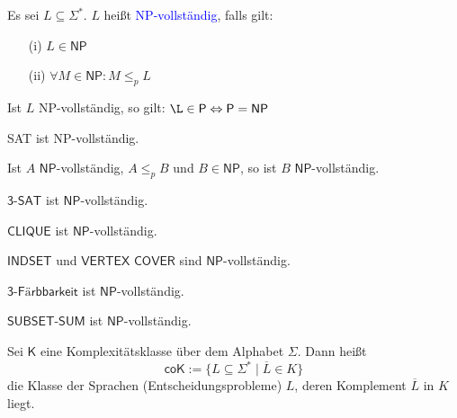 \documentclass{scrreprt}
\begin{document}
\begin{Definition}
Es sei $L\subseteq\Sigma^*$. $L$ heißt \textcolor{blue}{\textsf{NP}-vollständig}, falls gilt:
\begin{enumerate}
\item[(i)] $L\in \textsf{NP}$
\item[(ii)] $\forall M\in\textsf{NP}: M\leq_p L$
\end{enumerate}
\end{Definition}
\begin{Lemma}
Ist $L$ \textsf{NP}-vollständig, so gilt: $\L \in \textsf{P} \Leftrightarrow \textsf{P} = \textsf{NP}$
\end{Lemma}
\begin{Satz}
\textsf{SAT} ist \textsf{NP}-vollständig.
\end{Satz}
\begin{Satz}
Ist $A$ $\textsf{NP}$-vollständig, $A \leq_p B$ und $B \in \textsf{NP}$, so ist $B$ $\textsf{NP}$-vollständig.
\end{Satz}

\begin{Satz}
$\textsf{3-SAT}$ ist $\textsf{NP}$-vollständig.
\end{Satz}

\begin{Satz}
$\textsf{CLIQUE}$ ist $\textsf{NP}$-vollständig.
\end{Satz}

\begin{Satz}
$\textsf{INDSET}$ und $\textsf{VERTEX COVER}$ sind $\textsf{NP}$-vollständig.
\end{Satz}

\begin{Satz}
$\textsf{3-Färbbarkeit}$ ist $\textsf{NP}$-vollständig.
\end{Satz}

\begin{Satz}
$\textsf{SUBSET-SUM}$ ist $\textsf{NP}$-vollständig.
\end{Satz}

\begin{Definition}
Sei $\textsf{K}$ eine Komplexitätsklasse über dem Alphabet $\Sigma$. Dann heißt
\begin{equation*}
\textsf{coK} :=\{L\subseteq\Sigma^* \mid \overline{L} \in K\}
\end{equation*}
die Klasse der Sprachen (Entscheidungsprobleme) $L$, deren Komplement $\overline{L}$ in $K$ liegt.
\end{Definition}
\end{document}
